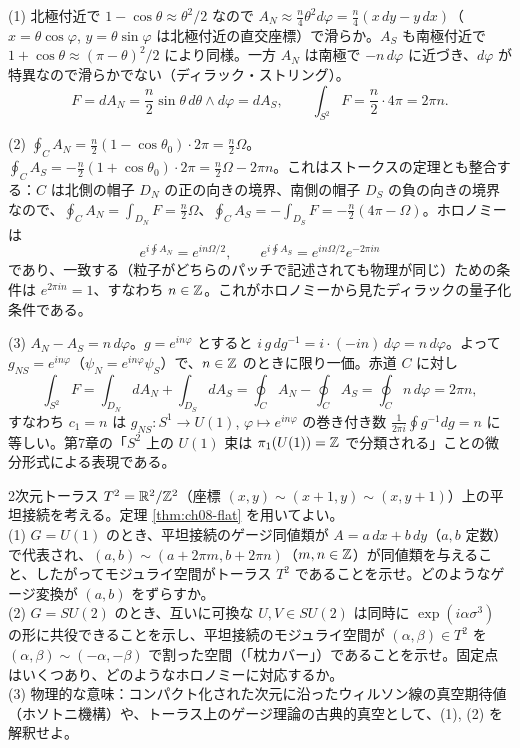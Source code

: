 \begin{solution}
(1) 北極付近で $1-\cos\theta\approx\theta^2/2$ なので $A_N\approx\frac n4\theta^2d\varphi=\frac n4(x\,dy-y\,dx)$（$x=\theta\cos\varphi$, $y=\theta\sin\varphi$ は北極付近の直交座標）で滑らか。$A_S$ も南極付近で $1+\cos\theta\approx(\pi-\theta)^2/2$ により同様。一方 $A_N$ は南極で $-n\,d\varphi$ に近づき、$d\varphi$ が特異なので滑らかでない（ディラック・ストリング）。
\[
F=dA_N=\frac n2\sin\theta\,d\theta\wedge d\varphi=dA_S,\qquad\int_{S^2}F=\frac n2\cdot4\pi=2\pi n .
\]

(2) $\oint_CA_N=\frac n2(1-\cos\theta_0)\cdot2\pi=\frac n2\Omega$。$\oint_CA_S=-\frac n2(1+\cos\theta_0)\cdot2\pi=\frac n2\Omega-2\pi n$。これはストークスの定理とも整合する：$C$ は北側の帽子 $D_N$ の正の向きの境界、南側の帽子 $D_S$ の負の向きの境界なので、$\oint_CA_N=\int_{D_N}F=\frac n2\Omega$、$\oint_CA_S=-\int_{D_S}F=-\frac n2(4\pi-\Omega)$。ホロノミーは
\[
e^{i\oint A_N}=e^{in\Omega/2},\qquad e^{i\oint A_S}=e^{in\Omega/2}e^{-2\pi in}
\]
であり、一致する（粒子がどちらのパッチで記述されても物理が同じ）ための条件は $e^{2\pi in}=1$、すなわち $n\in\mathbb{Z}$。これがホロノミーから見たディラックの量子化条件である。

(3) $A_N-A_S=n\,d\varphi$。$g=e^{in\varphi}$ とすると $i\,g\,dg^{-1}=i\cdot(-in)\,d\varphi=n\,d\varphi$。よって $g_{NS}=e^{in\varphi}$（$\psi_N=e^{in\varphi}\psi_S$）で、$n\in\mathbb{Z}$ のときに限り一価。赤道 $C$ に対し
\[
\int_{S^2}F=\int_{D_N}dA_N+\int_{D_S}dA_S=\oint_CA_N-\oint_CA_S=\oint_Cn\,d\varphi=2\pi n,
\]
すなわち $c_1=n$ は $g_{NS}\colon S^1\to U(1)$, $\varphi\mapsto e^{in\varphi}$ の巻き付き数 $\frac1{2\pi i}\oint g^{-1}dg=n$ に等しい。第7章の「$S^2$ 上の $U(1)$ 束は $\pi_1(U(1))=\mathbb{Z}$ で分類される」ことの微分形式による表現である。
\end{solution}

\begin{problem}[難易度 B]\label{ch08-prob-torus}
2次元トーラス $T^2=\mathbb{R}^2/\mathbb{Z}^2$（座標 $(x,y)\sim(x+1,y)\sim(x,y+1)$）上の平坦接続を考える。定理 \ref{thm:ch08-flat} を用いてよい。\\
(1) $G=U(1)$ のとき、平坦接続のゲージ同値類が $A=a\,dx+b\,dy$（$a,b$ 定数）で代表され、$(a,b)\sim(a+2\pi m,b+2\pi n)$（$m,n\in\mathbb{Z}$）が同値類を与えること、したがってモジュライ空間がトーラス $T^2$ であることを示せ。どのようなゲージ変換が $(a,b)$ をずらすか。\\
(2) $G=SU(2)$ のとき、互いに可換な $U,V\in SU(2)$ は同時に $\exp(i\alpha\sigma^3)$ の形に共役できることを示し、平坦接続のモジュライ空間が $(\alpha,\beta)\in T^2$ を $(\alpha,\beta)\sim(-\alpha,-\beta)$ で割った空間（「枕カバー」）であることを示せ。固定点はいくつあり、どのようなホロノミーに対応するか。\\
(3) 物理的な意味：コンパクト化された次元に沿ったウィルソン線の真空期待値（ホソトニ機構）や、トーラス上のゲージ理論の古典的真空として、(1), (2) を解釈せよ。
\end{problem}

